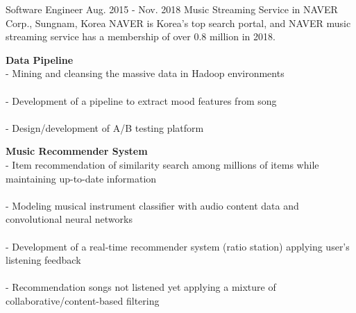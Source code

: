 \begin{cventries}
    \cventry
        {Software Engineer} %
        {Aug. 2015 - Nov. 2018} %
        {Music Streaming Service in NAVER Corp., } %
        {Sungnam, Korea}%
        { %
            NAVER is Korea's top search portal, and NAVER music streaming service has a membership of over 0.8 million in 2018.
        }
        { %
            \begin{cvitems}
                \item {
                    {\bf Data Pipeline} \\
                    - Mining and cleansing the massive data in Hadoop environments \\
                         \\
                    - Development of a pipeline to extract mood features from song \\
                         \\
                    - Design/development of A/B testing platform 
                         \nn
                }
                \item {
                    {\bf Music Recommender System} \\
                    - Item recommendation of similarity search among millions of items while maintaining up-to-date information \\
                         \\
                    - Modeling musical instrument classifier with audio content data and convolutional neural networks \\
                         \\
                    - Development of a real-time recommender system (ratio station) applying user's listening feedback \\
                         \\
                    - Recommendation songs not listened yet applying a mixture of collaborative/content-based filtering \\
                         \nn
                }
            \end{cvitems}
        }
\end{cventries}